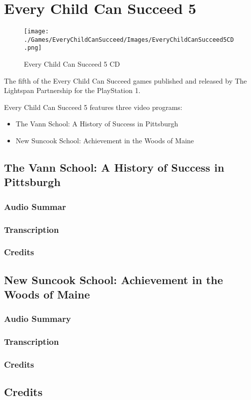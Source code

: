 \chapter{Every Child Can Succeed 5}

\begin{figure}[H]
    \centering
    \texttt{[image: ./Games/EveryChildCanSucceed/Images/EveryChildCanSucceed5CD.png]}
    \caption{Every Child Can Succeed 5 CD}
\end{figure}

The fifth of the Every Child Can Succeed games published and released by The Lightspan Partnership for the PlayStation 1.

Every Child Can Succeed 5 features three video programs:

\begin{itemize}
    \item The Vann School: A History of Success in Pittsburgh
    \item New Suncook School: Achievement in the Woods of Maine
\end{itemize}

\clearpage
\newpage

\section{The Vann School: A History of Success in Pittsburgh}

\subsection{Audio Summar}

\subsection{Transcription}

\subsection{Credits}

\section{New Suncook School: Achievement in the Woods of Maine}

\subsection{Audio Summary}

\subsection{Transcription}

\subsection{Credits}

\section{Credits}
